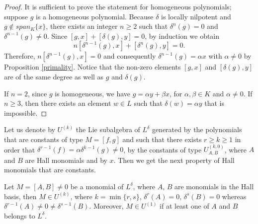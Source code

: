 \documentclass{cimart}
\begin{document}
\begin{proof}  It is sufficient to prove the statement for homogeneous polynomials; suppose $g$ is a homogeneous polynomial. Because $\delta$ is locally nilpotent and $g\notin  span_K\{x\}$, there exists an integer $n \geq 2$ such that $\delta^n(g) = 0$ and $\delta^{n-1}(g) \neq  0$. Since $[g, x] + [\delta(g), y] = 0$, by induction we obtain
\[
n[\delta^{n-1}(g), x] + [\delta^n(g), y] = 0.
\]
Therefore, $n[\delta^{n-1}(g), x] = 0$ and consequently $\delta^{n-1}(g) = \alpha x$ with $\alpha \neq 0$ by Proposition \ref{primality}.
Notice that the non-zero elements $[g, x]$ and $[\delta(g), y]$ are of the same degree as well as $g$ and $\delta(g)$.

If $n=2$, since $g$ is homogeneous, we have $g = \alpha y+\beta x$, for $\alpha,\beta\in K$ and $\alpha\neq0$.
If $n\geq3$, then there exists an element $w\in L$ such that $\delta(w)=\alpha y$ that is impossible.
\end{proof}

Let us denote by $U^{(k)}$ the Lie subalgebra of $L^\delta$ generated by the polynomials that are constants of type $M=[f,g]$ and such that there exists $r\geq k\geq 1$ in order that $\delta^{r-1}(f)=\alpha\delta^{k-1}(g)\neq 0$, by the constants of type $U^{(k,0)}_{A,B}$, where $A$ and $B$ are Hall monomials and by $x$. Then we get the next property of Hall monomials that are constants.

\begin{theorem}\label{monomial}
Let $M = [A, B] \neq 0$ be a monomial of $L^\delta$, where $A$, $B$ are monomials in the Hall basis, then {$M\in U^{(k)}$, where $k=\min\{r,s\}$, $\delta^r(A)=0$, $\delta^s(B)=0$ whereas $\delta^{r-1}(A)\neq0\neq\delta^{s-1}(B)$}. Moreover, $M\in U^{(1)}$ if at least one of $A$ and $B$ belongs to $L^\delta$.
\end{theorem}
\end{document}
